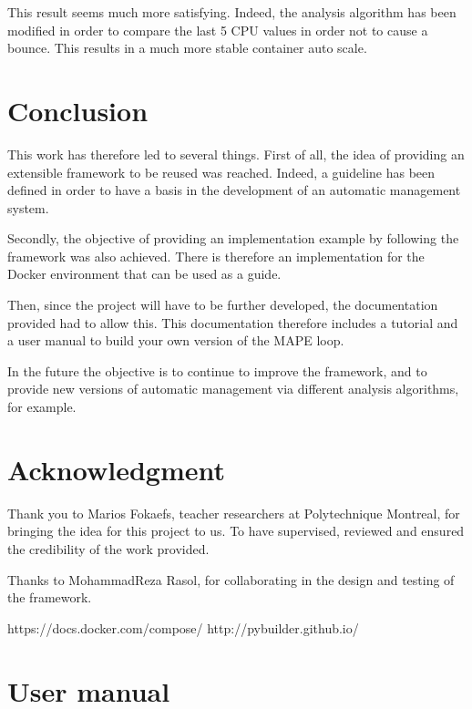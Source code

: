 \documentclass[11pt]{IEEEtran}
\begin{document}
This result seems much more satisfying. Indeed, the analysis algorithm has been modified in order to compare the last 5 CPU values in order not to cause a bounce. 
This results in a much more stable container auto scale.  

\section{Conclusion}
This work has therefore led to several things. 
First of all, the idea of providing an extensible framework to be reused was reached. Indeed, a guideline has been defined in order to have a basis in the development of an automatic management system. 

Secondly, the objective of providing an implementation example by following the framework was also achieved. There is therefore an implementation for the Docker environment that can be used as a guide.

Then, since the project will have to be further developed, the documentation provided had to allow this. This documentation therefore includes a tutorial and a user manual to build your own version of the MAPE loop.

In the future the objective is to continue to improve the framework, and to provide new versions of automatic management via different analysis algorithms, for example.


\section*{Acknowledgment}
Thank you to Marios Fokaefs, teacher researchers at Polytechnique Montreal, for bringing the idea for this project to us. To have supervised, reviewed and ensured the credibility of the work provided. 

Thanks to MohammadReza Rasol, for collaborating in the design and testing of the framework.

\begin{thebibliography}{00}
 https://docs.docker.com/compose/
 http://pybuilder.github.io/
\end{thebibliography}

\newpage
\appendices
\section{User manual}
\label{User manual}

\end{document}
